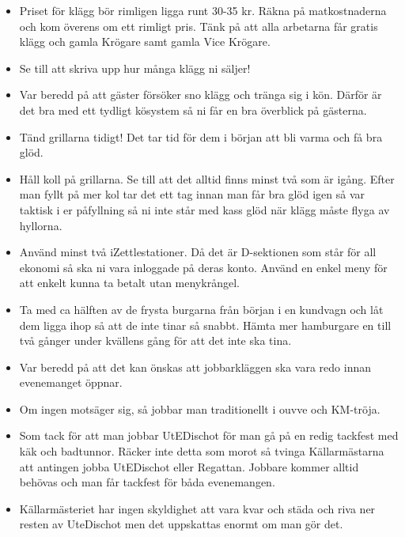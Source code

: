 \documentclass[10pt]{article}
\begin{document}
\begin{itemize}
	\item Priset för klägg bör rimligen ligga runt 30-35 kr. Räkna på matkostnaderna och kom överens om ett rimligt pris. Tänk på att alla arbetarna får gratis klägg och gamla Krögare samt gamla Vice Krögare.
    \item Se till att skriva upp hur många klägg ni säljer!
    \item Var beredd på att gäster försöker sno klägg och tränga sig i kön. Därför är det bra med ett tydligt kösystem så ni får en bra överblick på gästerna.
	\item Tänd grillarna tidigt! Det tar tid för dem i början att bli varma och få bra glöd.
    \item Håll koll på grillarna. Se till att det alltid finns minst två som är igång. Efter man fyllt på mer kol tar det ett tag innan man får bra glöd igen så var taktisk i er påfyllning så ni inte står med kass glöd när klägg måste flyga av hyllorna.
    \item Använd minst två iZettlestationer. Då det är D-sektionen som står för all ekonomi så ska ni vara inloggade på deras konto. Använd en enkel meny för att enkelt kunna ta betalt utan menykrångel.
    \item Ta med ca hälften av de frysta burgarna från början i en kundvagn och låt dem
ligga ihop så att de inte tinar så snabbt. Hämta mer hamburgare en till två gånger
under kvällens gång för att det inte ska tina.
	\item Var beredd på att det kan önskas att jobbarkläggen ska vara redo innan evenemanget öppnar.
    \item Om ingen motsäger sig, så jobbar man traditionellt i ouvve och KM-tröja.
    \item Som tack för att man jobbar UtEDischot för man gå på en redig tackfest med käk och badtunnor. Räcker inte detta som morot så tvinga Källarmästarna att antingen jobba UtEDischot eller Regattan. Jobbare kommer alltid behövas och man får tackfest för båda evenemangen.
    \item Källarmästeriet har ingen skyldighet att vara kvar och städa och riva ner resten av UteDischot men det uppskattas enormt om man gör det.
\end{itemize}
\end{document}
